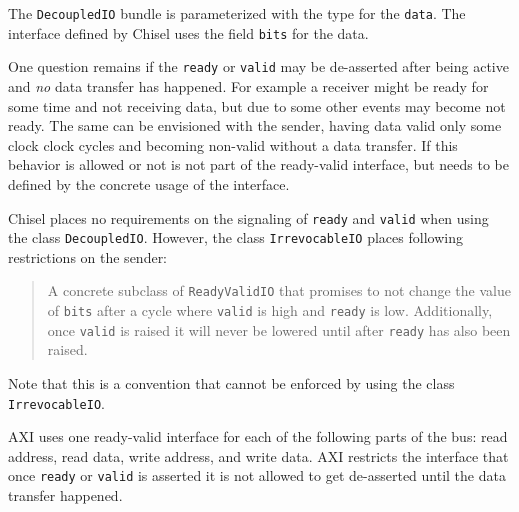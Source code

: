 \documentclass[%
    10pt,
    headinclude, footexclude,
    openright, %
    notitlepage,
    cleardoubleempty,
    headsepline,
    pointlessnumbers,
    bibtotoc, idxtotoc,
    ]{scrbook}
\newcommand{\code}[1]{{\small{\texttt{#1}}}}
\newcommand{\todo}[1]{{\emph{TODO: #1}}}
\renewcommand{\todo}[1]{}
\begin{document}

\noindent The \code{DecoupledIO} bundle is parameterized with the type for
the \code{data}. The interface defined by Chisel uses the field \code{bits}
for the data.

One question remains if the \code{ready} or \code{valid} may be de-asserted
after being active and \emph{no} data transfer has happened.
For example a receiver might be ready for some time and not receiving data, but
due to some other events may become not ready.
The same can be envisioned with the sender, having data valid only some clock
clock cycles and becoming non-valid without a data transfer.
If this behavior is allowed or not is not part of the ready-valid interface,
but needs to be defined by the concrete usage of the interface.

Chisel places no requirements on the signaling of \code{ready} and \code{valid}
when using the class \code{DecoupledIO}.
However, the class \code{IrrevocableIO} places following restrictions
on the sender:

\begin{quote}
A concrete subclass of \code{ReadyValidIO} that promises to not change
the value of \code{bits} after a cycle where \code{valid} is high and \code{ready} is low.
Additionally, once \code{valid} is raised it will never be lowered until after
\code{ready} has also been raised.
\end{quote}

\noindent Note that this is a convention that cannot be enforced by using the class
\code{IrrevocableIO}.

AXI uses one ready-valid interface for each of the following parts of the bus:
read address, read data, write address, and write data. AXI restricts the interface
that once \code{ready} or \code{valid} is asserted it is not allowed to get de-asserted
until the data transfer happened.

\todo{Read and cite AXI, and check if the above is true}

\todo{Reconsider writing the testing chapter}
\end{document}

